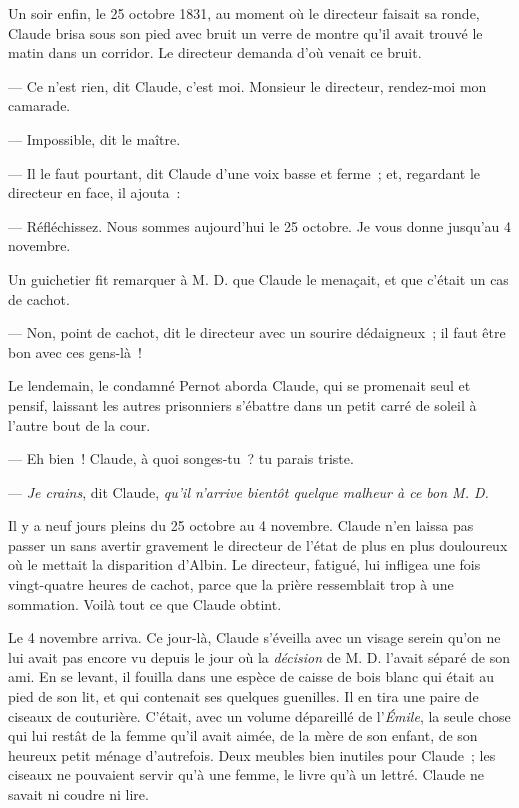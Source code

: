 \documentclass[french,twoside]{book} %
\begin{document}
Un soir enfin, le 25 octobre 1831, au moment où le directeur faisait sa ronde, Claude brisa sous son pied avec bruit un verre de montre qu’il avait trouvé le matin dans un corridor. Le directeur demanda d’où venait ce bruit.\par
— Ce n’est rien, dit Claude, c’est moi. Monsieur le directeur, rendez-moi mon camarade.\par
— Impossible, dit le maître.\par
— Il le faut pourtant, dit Claude d’une voix basse et ferme ; et, regardant le directeur en face, il ajouta :\par
— Réfléchissez. Nous sommes aujourd’hui le 25 octobre. Je vous donne jusqu’au 4 novembre.\par
Un guichetier fit remarquer à M. D. que Claude le menaçait, et que c’était un cas de cachot.\par
— Non, point de cachot, dit le directeur avec un sourire dédaigneux ; il faut être bon avec ces gens-là !\par
Le lendemain, le condamné Pernot aborda Claude, qui se promenait seul et pensif, laissant les autres prisonniers s’ébattre dans un petit carré de soleil à l’autre bout de la cour.\par
— Eh bien ! Claude, à quoi songes-tu ? tu parais triste.\par
— \emph{Je crains}, dit Claude, \emph{qu’il n’arrive bientôt quelque malheur à ce bon M. D.}\par
Il y a neuf jours pleins du 25 octobre au 4 novembre. Claude n’en laissa pas passer un sans avertir  gravement le directeur de l’état de plus en plus douloureux où le mettait la disparition d’Albin. Le directeur, fatigué, lui infligea une fois vingt-quatre heures de cachot, parce que la prière ressemblait trop à une sommation. Voilà tout ce que Claude obtint.\par
Le 4 novembre arriva. Ce jour-là, Claude s’éveilla avec un visage serein qu’on ne lui avait pas encore vu depuis le jour où la \emph{décision} de M. D. l’avait séparé de son ami. En se levant, il fouilla dans une espèce de caisse de bois blanc qui était au pied de son lit, et qui contenait ses quelques guenilles. Il en tira une paire de ciseaux de couturière. C’était, avec un volume dépareillé de l’\emph{Émile}, la seule chose qui lui restât de la femme qu’il avait aimée, de la mère de son enfant, de son heureux petit ménage d’autrefois. Deux meubles bien inutiles pour Claude ; les ciseaux ne pouvaient servir qu’à une femme, le livre qu’à un lettré. Claude ne savait ni coudre ni lire.\par
\end{document}
